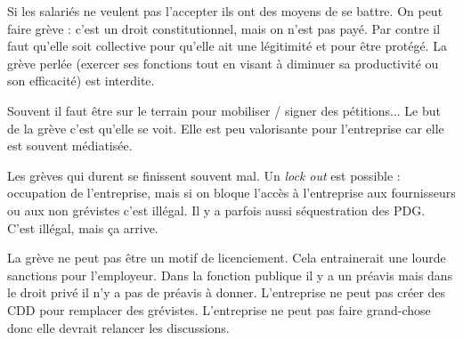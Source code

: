 Si les salariés ne veulent pas l'accepter ils ont des moyens de se battre.
On peut faire grève : c'est un droit constitutionnel, mais on n'est pas payé.
Par contre il faut qu'elle soit collective pour qu'elle ait une légitimité et pour être protégé.
La grève perlée (exercer ses fonctions tout en visant à diminuer sa productivité ou son efficacité) est interdite.

Souvent il faut être sur le terrain pour mobiliser / signer des pétitions...
Le but de la grève c'est qu'elle se voit.
Elle est peu valorisante pour l'entreprise car elle est souvent médiatisée.

Les grèves qui durent se finissent souvent mal.
Un \textit{lock out} est possible : occupation de l'entreprise, mais si on bloque l'accès à l'entreprise aux fournisseurs ou aux non grévistes c'est illégal.
Il y a parfois aussi séquestration des PDG.
C'est illégal, mais ça arrive.

La grève ne peut pas être un motif de licenciement.
Cela entrainerait une lourde sanctions pour l'employeur.
Dans la fonction publique il y a un préavis mais dans le droit privé il n'y a pas de préavis à donner.
L'entreprise ne peut pas créer des CDD pour remplacer des grévistes.
L'entreprise ne peut pas faire grand-chose donc elle devrait relancer les discussions.